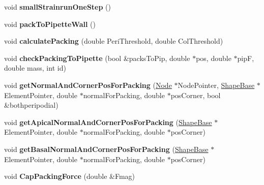 \begin{DoxyCompactItemize}
\item 
\hypertarget{classSimulation_a977de0c85607b9c8e4422ca90776e72a}{}void {\bfseries small\+Strainrun\+One\+Step} ()\label{classSimulation_a977de0c85607b9c8e4422ca90776e72a}

\item 
\hypertarget{classSimulation_a5400ce12848ff3886d56437519728382}{}void {\bfseries pack\+To\+Pipette\+Wall} ()\label{classSimulation_a5400ce12848ff3886d56437519728382}

\item 
\hypertarget{classSimulation_ac71d762415384de17ed651db09c3d7be}{}void {\bfseries calculate\+Packing} (double Peri\+Threshold, double Col\+Threshold)\label{classSimulation_ac71d762415384de17ed651db09c3d7be}

\item 
\hypertarget{classSimulation_a4789349db2f4a908064f05e0ee74265d}{}void {\bfseries check\+Packing\+To\+Pipette} (bool \&packs\+To\+Pip, double $\ast$pos, double $\ast$pip\+F, double mass, int id)\label{classSimulation_a4789349db2f4a908064f05e0ee74265d}

\item 
\hypertarget{classSimulation_a93325d2848bfe281bff7c373ad369f86}{}void {\bfseries get\+Normal\+And\+Corner\+Pos\+For\+Packing} (\hyperlink{classNode}{Node} $\ast$Node\+Pointer, \hyperlink{classShapeBase}{Shape\+Base} $\ast$Element\+Pointer, double $\ast$normal\+For\+Packing, double $\ast$pos\+Corner, bool \&bothperipodial)\label{classSimulation_a93325d2848bfe281bff7c373ad369f86}

\item 
\hypertarget{classSimulation_a532ee0b0d6b016b898391fc7188187cc}{}void {\bfseries get\+Apical\+Normal\+And\+Corner\+Pos\+For\+Packing} (\hyperlink{classShapeBase}{Shape\+Base} $\ast$Element\+Pointer, double $\ast$normal\+For\+Packing, double $\ast$pos\+Corner)\label{classSimulation_a532ee0b0d6b016b898391fc7188187cc}

\item 
\hypertarget{classSimulation_a80ed7a37c28be0fd5bdbd097e4b44344}{}void {\bfseries get\+Basal\+Normal\+And\+Corner\+Pos\+For\+Packing} (\hyperlink{classShapeBase}{Shape\+Base} $\ast$Element\+Pointer, double $\ast$normal\+For\+Packing, double $\ast$pos\+Corner)\label{classSimulation_a80ed7a37c28be0fd5bdbd097e4b44344}

\item 
\hypertarget{classSimulation_a33120f358a608cf6ede1a45715a8f990}{}void {\bfseries Cap\+Packing\+Force} (double \&Fmag)\label{classSimulation_a33120f358a608cf6ede1a45715a8f990}


\end{DoxyCompactItemize}
